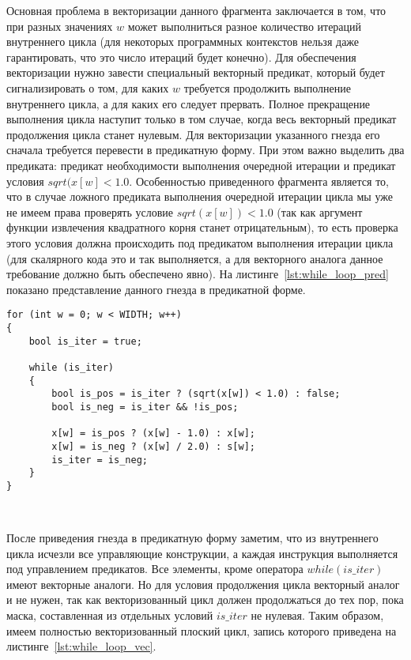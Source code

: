 \documentclass[
11pt,%
tightenlines,%
twoside,%
onecolumn,%
nofloats,%
nobibnotes,%
nofootinbib,%
superscriptaddress,%
noshowpacs,%
centertags]%
{revtex4}
\begin{document}
Основная проблема в векторизации данного фрагмента заключается в том, что при разных значениях $w$ может выполниться разное количество итераций внутреннего цикла (для некоторых программных контекстов нельзя даже гарантировать, что это число итераций будет конечно).
Для обеспечения векторизации нужно завести специальный векторный предикат, который будет сигнализировать о том, для каких $w$ требуется продолжить выполнение внутреннего цикла, а для каких его следует прервать.
Полное прекращение выполнения цикла наступит только в том случае, когда весь векторный предикат продолжения цикла станет нулевым.
Для векторизации указанного гнезда его сначала требуется перевести в предикатную форму.
При этом важно выделить два предиката: предикат необходимости выполнения очередной итерации и предикат условия $sqrt(x[w] < 1.0$.
Особенностью приведенного фрагмента является то, что в случае ложного предиката выполнения очередной итерации цикла мы уже не имеем права проверять условие $sqrt(x[w]) < 1.0$ (так как аргумент функции извлечения квадратного корня станет отрицательным), то есть проверка этого условия должна происходить под предикатом выполнения итерации цикла (для скалярного кода это и так выполняется, а для векторного аналога данное требование должно быть обеспечено явно).
На листинге~\ref{lst:while_loop_pred} показано представление данного гнезда в предикатной форме.

\begin{lstlisting}[caption={Предикатная форма плоского цикла, содержащего цикл с неконстантным числом итераций},label={lst:while_loop_pred}]
for (int w = 0; w < WIDTH; w++)
{
    bool is_iter = true;

    while (is_iter)
    {
        bool is_pos = is_iter ? (sqrt(x[w]) < 1.0) : false;
        bool is_neg = is_iter && !is_pos;    
    
        x[w] = is_pos ? (x[w] - 1.0) : x[w];
        x[w] = is_neg ? (x[w] / 2.0) : s[w];
        is_iter = is_neg;
    }
}
\end{lstlisting}

\

После приведения гнезда в предикатную форму заметим, что из внутреннего цикла исчезли все управляющие конструкции, а каждая инструкция выполняется под управлением предикатов.
Все элементы, кроме оператора $while (is\_iter)$ имеют векторные аналоги.
Но для условия продолжения цикла векторный аналог и не нужен, так как векторизованный цикл должен продолжаться до тех пор, пока маска, составленная из отдельных условий $is\_iter$ не нулевая.
Таким образом, имеем полностью векторизованный плоский цикл, запись которого приведена на листинге~\ref{lst:while_loop_vec}.
\end{document}
